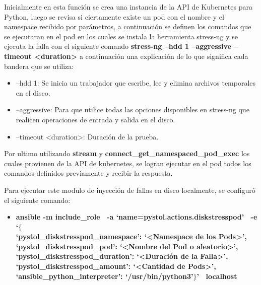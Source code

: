 \par Inicialmente en esta función se crea una instancia de la API de Kubernetes para Python, luego se revisa si ciertamente existe un pod con el nombre y el namespace recibido por parámetros, a continuación se definen los comandos que se ejecutaran en el pod en los cuales se instala la herramienta stress-ng y se ejecuta la falla con el siguiente comando
\textbf{stress-ng --hdd 1 --aggressive --timeout <duration> } a continuación una explicación de lo que significa cada bandera que se utiliza:
\begin{itemize}
        \item --hdd 1: Se inicia un trabajador que escribe, lee y elimina archivos temporales en el disco.        
        \item --aggressive: Para que utilice todas las opciones disponibles en stress-ng que realicen operaciones de entrada y salida en el disco.
        \item --timeout <duration>: Duración de la prueba.\\
    \end{itemize}

\par Por ultimo utilizando \textbf{stream} y \textbf{connect\_get\_namespaced\_pod\_exec} los cuales provienen de la API de kubernetes, se logran ejecutar en el pod todos los comandos definidos previamente y recibir la respuesta.\\
\label{sec:expli_test1}
\par Para ejecutar este modulo de inyección de fallas en disco localmente, se configur\'o el siguiente comando:
\begin{itemize}
    \item \textbf{ansible -m include\_role \ -a `name=pystol.actions.diskstresspod' \ -e `$\{$ \\
    `pystol\_diskstresspod\_namespace': `<Namespace de los Pods>', \\
    `pystol\_diskstresspod\_pod': `<Nombre del Pod o aleatorio>', \\
    `pystol\_diskstresspod\_duration': `<Duración de la Falla>', \\
    `pystol\_diskstresspod\_amount': `<Cantidad de Pods>', \\
    `ansible\_python\_interpreter': `/usr/bin/python3'$\}$' \ localhost} %
\end{itemize}

